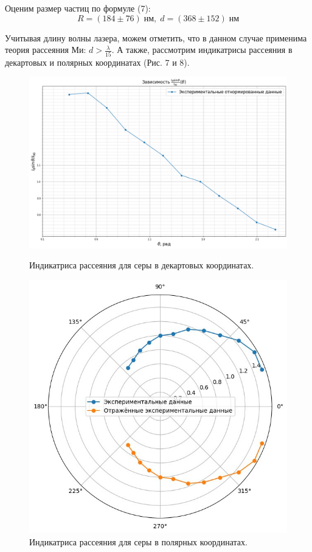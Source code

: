 \documentclass{article}
\begin{document}
\par Оценим размер частиц по формуле (7):
$$R = (184 \pm 76) \;\text{нм}, \; d = (368 \pm 152) \;\text{нм}$$
\par Учитывая длину волны лазера, можем отметить, что в данном случае применима теория рассеяния Ми: $d > \frac{\lambda}{15}$. А также, рассмотрим индикатрисы рассеяния в декартовых и полярных координатах (Рис. 7 и 8).
\begin{figure}[!htb] 
        \centering
        \centering
            \includegraphics[width=1\linewidth]{Images/декарт.png}
                 \caption{Индикатриса рассеяния для серы в декартовых координатах.}
        \endminipage\hfill
        \centering
             \includegraphics[width=0.69\linewidth]{Images/индикатрисса.jpg}
                 \caption{Индикатриса рассеяния для серы в полярных координатах.}
        \endminipage
\end{figure}
\end{document}
